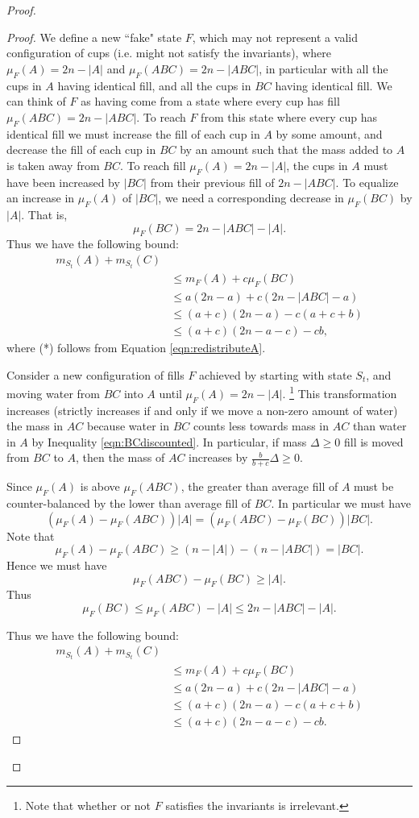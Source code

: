 \documentclass[twocolumn]{article}[10pt]
\begin{document}
\begin{proof}
\begin{proof}
{We define a new ``fake" state $F$, which may not represent
a valid configuration of cups (i.e. might not satisfy the invariants), where
$\mu_F(A)=2n-|A|$ and $\mu_F(ABC)=2n-|ABC|$, in particular with all the cups in $A$
having identical fill, and all the cups in $BC$ having identical fill.
We can think of $F$ as having come from a state where every cup has fill
$\mu_F(ABC) = 2n-|ABC|$. To reach $F$ from this state where every cup has
identical fill we must increase the fill of each cup in $A$ by some amount, and
decrease the fill of each cup in $BC$ by an amount such that the mass added to
$A$ is taken away from $BC$. To reach fill $\mu_F(A) = 2n-|A|$, the cups in $A$
must have been increased by $|BC|$ from their previous fill of $2n-|ABC|$.
To equalize an increase in $\mu_{F}(A)$ of $|BC|$, we need a corresponding
decrease in $\mu_{F}(BC)$ by $|A|$.
That is, $$\mu_{F}(BC) = 2n-|ABC|-|A|.$$
Thus we have the following bound:
\begin{align*}
  m_{S_t}(A) + m_{S_t}(C)& \\
&\le m_{F}(A) + c\mu_{F}(BC) \tag{*}\\
&\le a(2n-a) + c(2n-|ABC|-a) \\
&\le (a+c)(2n-a) - c(a+c+b) \\
&\le (a+c)(2n-a-c) - cb,
\end{align*}
where (*) follows from Equation \ref{eqn:redistributeA}.
}

{\color{blue}
  Consider a new configuration of fills $F$ achieved by starting with state
  $S_t$, and moving water from $BC$ into $A$ until $\mu_{F}(A) = 2n-|A|$.
  \footnote{Note that whether or not $F$ satisfies the invariants is irrelevant.}
  This transformation increases (strictly increases if and only if we move a
  non-zero amount of water) the mass in $AC$ because water in $BC$
  counts less towards mass in $AC$ than water in $A$ by Inequality
  \ref{eqn:BCdiscounted}. In particular, if mass $\Delta \ge 0$ fill is moved from
  $BC$ to $A$, then the mass of $AC$ increases by $\frac{b}{b+c} \Delta \ge 0$.

  Since $\mu_F(A)$ is above $\mu_{F}(ABC)$, the greater than average fill of
  $A$ must be counter-balanced by the lower than average fill of $BC$. In
  particular we must have
  $$(\mu_F(A) - \mu_F(ABC))|A| = (\mu_F(ABC) -\mu_F(BC))|BC|.$$
  Note that $$\mu_F(A) -\mu_F(ABC) \ge (n-|A|) - (n-|ABC|) = |BC|.$$
  Hence we must have 
  $$\mu_F(ABC) - \mu_F(BC) \ge |A|.$$
  Thus 
  $$\mu_F(BC) \le \mu_F(ABC) - |A| \le 2n-|ABC| -|A|.$$

  Thus we have the following bound:
  \begin{align*}
    m_{S_t}(A) + m_{S_t}(C)& \\
  &\le m_{F}(A) + c\mu_{F}(BC)\\
  &\le a(2n-a) + c(2n-|ABC|-a) \\
  &\le (a+c)(2n-a) - c(a+c+b) \\
  &\le (a+c)(2n-a-c) - cb.
  \end{align*}
}


\end{proof}
\end{proof}
\end{document}
